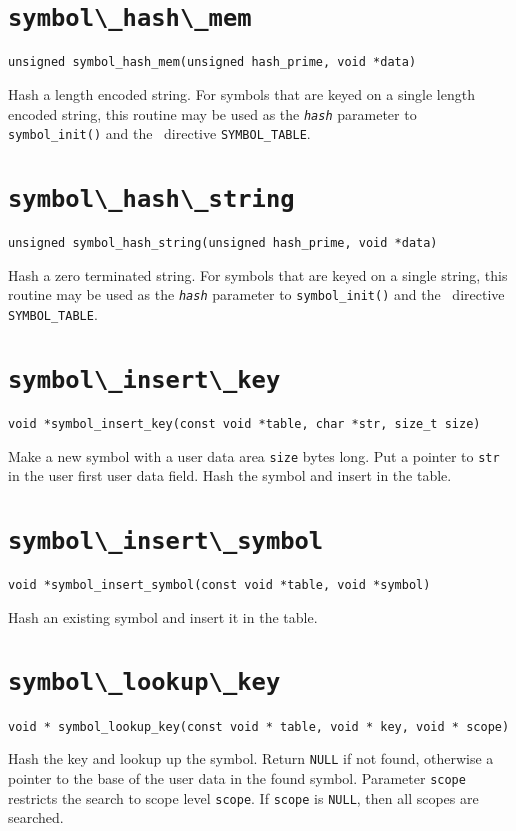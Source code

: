 \section{\protect\verb+symbol\_hash\_mem+}
\begin{verbatim}
unsigned symbol_hash_mem(unsigned hash_prime, void *data)
\end{verbatim}
Hash a length encoded string.
For symbols that are keyed on a
single length encoded string, this routine may be used as the {\tt\em hash}
parameter to \verb+symbol_init()+ and the \rdp\ directive \verb+SYMBOL_TABLE+.


\section{\protect\verb+symbol\_hash\_string+}
\begin{verbatim}
unsigned symbol_hash_string(unsigned hash_prime, void *data) 
\end{verbatim}
Hash a zero terminated string.
For symbols that are keyed on a
single string, this routine may be used as the {\tt\em hash}
parameter to \verb+symbol_init()+ and the \rdp\ directive \verb+SYMBOL_TABLE+.

\section{\protect\verb+symbol\_insert\_key+}
\begin{verbatim}
void *symbol_insert_key(const void *table, char *str, size_t size)
\end{verbatim}
Make a new symbol with a user data area {\tt size} bytes long.
Put a pointer to {\tt str} in the user first user
data field. Hash the symbol and insert in the table. 

\section{\protect\verb+symbol\_insert\_symbol+}
\begin{verbatim}
void *symbol_insert_symbol(const void *table, void *symbol) 
\end{verbatim}
Hash an existing symbol and insert it in the table.

\section{\protect\verb+symbol\_lookup\_key+}
\begin{verbatim}
void * symbol_lookup_key(const void * table, void * key, void * scope)
\end{verbatim}
Hash the key and lookup up the symbol. Return {\tt NULL} if not found,
otherwise a pointer to the base of the user data in the found symbol.
Parameter {\tt scope} restricts the search to scope level {\tt scope}.
If {\tt scope} is {\tt NULL}, then all scopes are searched.

